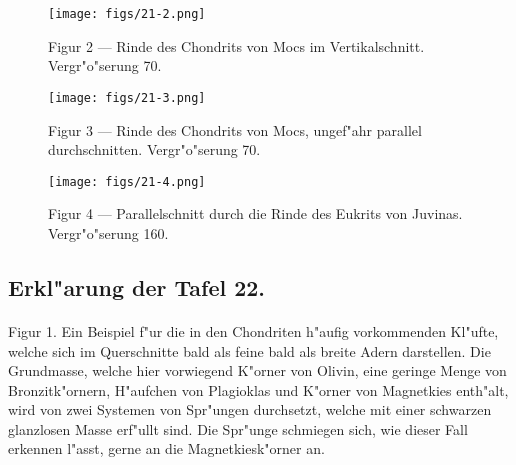 \documentclass[a4paper, 11pt, oneside, polutonikogreek, german]{article}
\begin{document}
\vspace*{\fill}
\begin{figure}[H]
\centering
\texttt{[image: figs/21-2.png]}
\caption{\small Figur 2 --- Rinde des Chondrits von Mocs im Vertikalschnitt. Vergr"o"serung 70.}
\end{figure}
\vspace*{\fill}
\clearpage

\vspace*{\fill}
\begin{figure}[H]
\centering
\texttt{[image: figs/21-3.png]}
\caption{\small Figur 3 --- Rinde des Chondrits von Mocs, ungef"ahr parallel durchschnitten. Vergr"o"serung 70.}
\end{figure}
\vspace*{\fill}
\clearpage

\vspace*{\fill}
\begin{figure}[H]
\centering
\texttt{[image: figs/21-4.png]}
\caption{\small Figur 4 --- Parallelschnitt durch die Rinde des Eukrits von Juvinas. Vergr"o"serung 160.}
\end{figure}
\vspace*{\fill}
\clearpage

\subsection{Erkl"arung der Tafel 22.}
\paragraph{}
Figur 1. Ein Beispiel f"ur die in den Chondriten h"aufig vorkommenden Kl"ufte, welche sich im Querschnitte bald als feine bald als breite Adern darstellen. Die Grundmasse, welche hier vorwiegend K"orner von Olivin, eine geringe Menge von Bronzitk"ornern, H"aufchen von Plagioklas und K"orner von Magnetkies enth"alt, wird von zwei Systemen von Spr"ungen durchsetzt, welche mit einer schwarzen glanzlosen Masse erf"ullt sind. Die Spr"unge schmiegen sich, wie dieser Fall erkennen l"asst, gerne an die Magnetkiesk"orner an.
\end{document}
